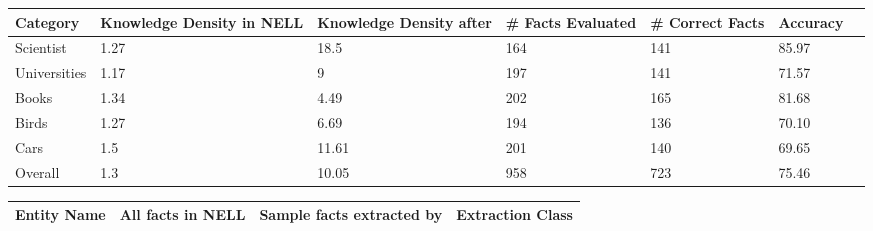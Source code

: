 

\begin{table*}[!htb]
\begin{small}
\begin{center}
\begin{tabular}{|p{2cm}|p{2cm}|p{2.5cm}|p{2cm}|p{2cm}|p{2cm}|p{2cm}|}
\hline
\textbf{Category} & \textbf{Knowledge Density in NELL} & \textbf{Knowledge Density after \system{}} & \textbf{\# Facts Evaluated} & \textbf{\# Correct Facts} & \textbf{Accuracy}\\
\hline
Scientist & 1.27 & 18.5 & 164 & 141 & 85.97 \\
\hline
Universities & 1.17 & 9 & 197 & 141 & 71.57\\
\hline
Books & 1.34 & 4.49 & 202 & 165 & 81.68 \\
\hline
Birds & 1.27 & 6.69 & 194 & 136 & 70.10 \\
\hline
Cars & 1.5 & 11.61 & 201 & 140 & 69.65 \\
\hline
\hline
Overall & 1.3 & 10.05 & 958 & 723 & 75.46 \\
\hline
\end{tabular}
\caption{\label{tbl:main_result}Knowledge densities of five categories in NELL and after application of \system{}, along with resulting accuracy. We observe that overall, \system{} is able to increase knowledge density by a factor of 7.7 at 75.5\% accuracy. This is our main result.}
\end{center}
%
\begin{tabular}{|p{2.3cm}|p{4.6cm}|p{5.5cm}|p{2cm}|}
\hline
\textbf{Entity Name} & \textbf{All facts in NELL} & \textbf{Sample facts extracted by \system{}} & \textbf{Extraction Class} \\
\hline

\end{tabular}
\end{small}
\end{table*}
